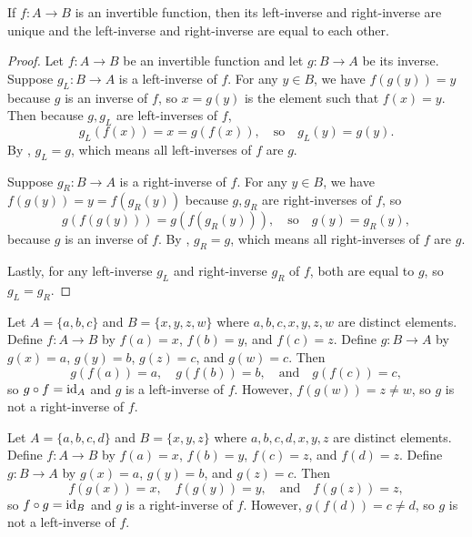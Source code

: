 \begin{prop}\label{ch1thm_fn_inv_unique}
	If $f:A\rightarrow B$ is an invertible function, then its left-inverse and right-inverse are unique and the left-inverse and right-inverse are equal to each other. 
\end{prop}
\begin{proof}
	Let $f:A\rightarrow B$ be an invertible function and let $g:B\rightarrow A$ be its inverse. 
	Suppose $g_{L}:B\rightarrow A$ is a left-inverse of $f$.
	For any $y\in B$, we have $f(g(y)) = y$ because $g$ is an inverse of $f$, so $x = g(y)$ is the element such that $f(x) = y$.
	Then because $g, g_{L}$ are left-inverses of $f$, 
	\[ g_{L}(f(x)) = x = g(f(x)), \quad\text{so}\quad g_{L}(y) = g(y). \]
	By , $g_{L} = g$, which means all left-inverses of $f$ are $g$. 
	
	Suppose $g_{R}:B\rightarrow A$ is a right-inverse of $f$.
	For any $y\in B$, we have $f(g(y)) = y = f(g_{R}(y))$ because $g, g_{R}$ are right-inverses of $f$, so
	\[ g(f(g(y))) = g(f(g_{R}(y))), \quad\text{so}\quad g(y) = g_{R}(y), \]
	because $g$ is an inverse of $f$. 
	By , $g_{R} = g$, which means all right-inverses of $f$ are $g$.
	
	Lastly, for any left-inverse $g_{L}$ and right-inverse $g_{R}$ of $f$, both are equal to $g$, so $g_{L} = g_{R}$. 
\end{proof}

\begin{example}
	Let $A = \{a, b, c\}$ and $B = \{x, y, z, w\}$ where $a, b, c, x, y, z, w$ are distinct elements. 
	Define $f:A\rightarrow B$ by $f(a) = x$, $f(b) = y$, and $f(c) = z$.
	Define $g:B\rightarrow A$ by $g(x) = a$, $g(y) = b$, $g(z) = c$, and $g(w) = c$.
	Then
	\[ g(f(a)) = a,\quad g(f(b)) = b,\quad\text{and}\quad g(f(c)) = c, \]
	so $g\circ f = \operatorname{id}_A$ and $g$ is a left-inverse of $f$.
	However, $f(g(w)) = z\ne w$, so $g$ is not a right-inverse of $f$.
\end{example}

\begin{example}
	Let $A = \{a, b, c, d\}$ and $B = \{x, y, z\}$ where $a, b, c, d, x, y, z$ are distinct elements. 
	Define $f:A\rightarrow B$ by $f(a) = x$, $f(b) = y$, $f(c) = z$, and $f(d) = z$.
	Define $g:B\rightarrow A$ by $g(x) = a$, $g(y) = b$, and $g(z) = c$.
	Then
	\[ f(g(x)) = x,\quad f(g(y)) = y,\quad\text{and}\quad f(g(z)) = z, \]
	so $f\circ g = \operatorname{id}_B$ and $g$ is a right-inverse of $f$.
	However, $g(f(d)) = c\ne d$, so $g$ is not a left-inverse of $f$.
\end{example}

